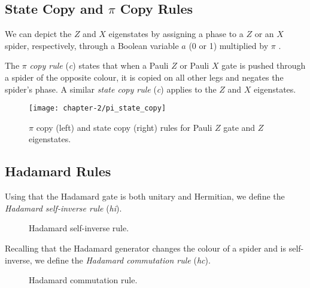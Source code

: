 

\subsection{State Copy and $\pi$ Copy Rules}%

We can depict the $Z$ and $X$ eigenstates by assigning a phase to a $Z$ or an $X$ spider, respectively, through a Boolean variable $a$ (0 or 1) multiplied by $\pi$ \cite{Wetering2020}.

%

The $\pi$ \textit{copy rule} (\textit{c}) states that when a Pauli $Z$ or Pauli $X$ gate is pushed through a spider of the opposite colour, it is copied on all other legs and negates the spider's phase. A similar \textit{state copy rule} (\textit{c}) applies to the $Z$ and $X$ eigenstates.

\begin{figure}[H]
    \centering
    \texttt{[image: chapter-2/pi\_state\_copy]}
    \caption{$\pi$ copy (left) and state copy (right) rules for Pauli $Z$ gate and $Z$ eigenstates.}
    \label{state-copy}
    \label{pi-copy}
\end{figure}


\subsection{Hadamard Rules}

Using that the Hadamard gate is both unitary and Hermitian, we define the \textit{Hadamard self-inverse rule} (\textit{hi}).

\begin{figure}[H]
    \centering
    \caption{Hadamard self-inverse rule.}
    \label{hadamard-self-inverse}
\end{figure}

Recalling that the Hadamard generator changes the colour of a spider and is self-inverse, we define the \textit{Hadamard commutation rule} (\textit{hc}).

\begin{figure}[H]
    \centering
    \caption{Hadamard commutation rule.}
    \label{hadamard-commutation}
\end{figure}

